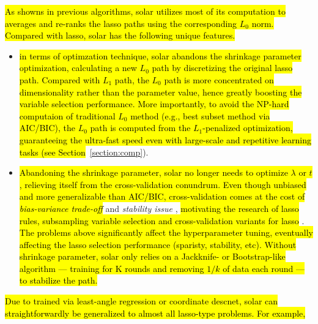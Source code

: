 \documentclass[12pt]{article}
\begin{document}
\hl{As showns in previous algorithms, solar utilizes most of its computation to averages and re-ranks the lasso paths using the corresponding $L_0$ norm. Compared with lasso, solar has the following unique features. 
}
\begin{itemize}
  
  \item \hl{in terms of optimzation technique, solar abandons the shrinkage parameter optimization, calculating a new $L_0$ path by discretizing the original lasso path. Compared with $L_1$ path, the $L_0$ path is more concentrated on dimensionality rather than the parameter value, hence greatly boosting the variable selection performance. More importantly, to avoid the NP-hard computaion of traditional $L_0$ method (e.g., best subset method via AIC/BIC), the $L_0$ path is computed from the $L_1$-penalized optimization, guaranteeing the ultra-fast speed even with large-scale and repetitive learning tasks (see Section}~\ref{section:comp}).

  \item \hl{Abandoning the shrinkage parameter, solar no longer needs to optimize $\lambda$ or $t$, relieving itself from the cross-validation conundrum. Even though unbiased and more generalizable than AIC/BIC, cross-validation comes at the cost of \emph{bias-variance trade-off}} \citep{kearns1999algorithmic} and \emph{stability issue} \citep{lim2016estimation}, \hl{motivating the research of lasso rules, subsampling variable selection and cross-validation variants for lasso} \citep{xu2012asymptotic}. \hl{The problems above significantly affect the hyperparameter tuning, eventually affecting the lasso selection performance (sparisty, stability, etc). Without shrinkage parameter, solar only relies on a Jackknife- or Bootstrap-like algorithm --- training for K rounds and removing $1/k$ of data each round --- to stabilize the path.}

\end{itemize}

\hl{Due to trained via least-angle regression or coordinate descnet, solar can straightforwardly be generalized to almost all lasso-type problems. For example, }
\end{document}
